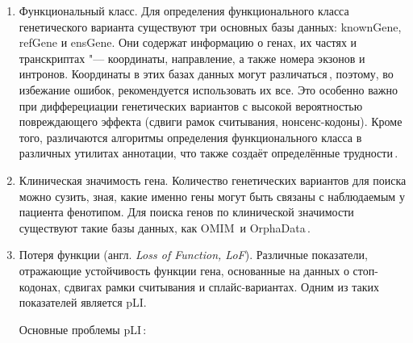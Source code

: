 \documentclass[12pt, twoside, a4paper]{article}
\newcommand{\engterm}[1]{англ. \textenglish{\textit{#1}}}
\begin{document}
\begin{enumerate}
	\item Функциональный класс.
	      Для определения функционального класса генетического варианта существуют три основных базы данных: knownGene, refGene и ensGene.
	      Они содержат информацию о генах, их частях и транскриптах "--- координаты, направление, а также номера экзонов и интронов.
	      Координаты в этих базах данных могут различаться\,\cite{McCarthy_2014}, поэтому, во избежание ошибок, рекомендуется использовать их все.
	      Это особенно важно при дифферециации генетических вариантов с высокой вероятностью повреждающего эффекта (сдвиги рамок считывания, нонсенс-кодоны).
	      Кроме того, различаются алгоритмы определения функционального класса в различных утилитах аннотации, что также создаёт определённые трудности\,\cite{Jesaitis_2014}.

	\item Клиническая значимость гена.
	      Количество генетических вариантов для поиска можно сузить, зная, какие именно гены могут быть связаны с наблюдаемым у пациента фенотипом.
	      Для поиска генов по клинической значимости существуют такие базы данных, как OMIM\,\cite{Amberger_2014} и OrphaData\,\cite{Orphanet}.

	\item Потеря функции (\engterm{Loss of Function, LoF}).
	      Различные показатели, отражающие устойчивость функции гена, основанные на данных о стоп-кодонах, сдвигах рамки считывания и сплайс-вариантах.
	      Одним из таких показателей является pLI.

	      Основные проблемы pLI\,\cite{Ziegler_2019}:


\end{enumerate}
\end{document}
